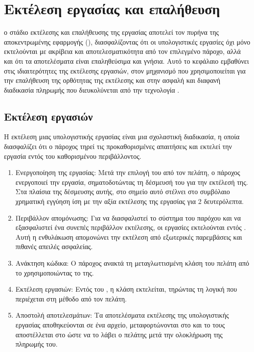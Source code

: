 \chapter{Εκτέλεση εργασίας και επαλήθευση}
 ο στάδιο εκτέλεσης και επαλήθευσης της εργασίας αποτελεί τον πυρήνα της αποκεντρωμένης εφαρμογής (), διασφαλίζοντας ότι οι υπολογιστικές εργασίες όχι μόνο εκτελούνται με ακρίβεια και αποτελεσματικότητα από τον επιλεγμένο πάροχο, αλλά και ότι τα αποτελέσματα είναι επαληθεύσιμα και γνήσια. Αυτό το κεφάλαιο εμβαθύνει στις ιδιαιτερότητες της εκτέλεσης εργασιών, στον μηχανισμό που χρησιμοποιείται για την επαλήθευση της ορθότητας της εκτέλεσης και στην ασφαλή και διαφανή διαδικασία πληρωμής που διευκολύνεται από την τεχνολογία .


\section{Εκτέλεση εργασιών}
Η εκτέλεση μιας υπολογιστικής εργασίας είναι μια σχολαστική διαδικασία, η οποία διασφαλίζει ότι ο πάροχος τηρεί τις προκαθορισμένες απαιτήσεις και εκτελεί την εργασία εντός του καθορισμένου περιβάλλοντος.
\begin{enumerate}
    \item Ενεργοποίηση της εργασίας: Μετά την επιλογή του από τον πελάτη, ο πάροχος ενεργοποιεί την εργασία, σηματοδοτώντας τη δέσμευσή του για την εκτέλεσή της. Στα πλαίσια της δέσμευσης αυτής, στο σημείο αυτό στέλνει στο συμβόλαιο χρηματική εγγύηση ίση με την αξία εκτέλεσης της εργασίας για 2 δευτερόλεπτα.
    \item Περιβάλλον απομόνωσης: Για να διασφαλιστεί το σύστημα του παρόχου και να εξασφαλιστεί ένα συνεπές περιβάλλον εκτέλεσης, οι εργασίες εκτελούνται εντός . Αυτή η ενθυλάκωση απομονώνει την εκτέλεση από εξωτερικές παρεμβάσεις και πιθανές απειλές ασφαλείας.
    \item Ανάκτηση κώδικα: Ο πάροχος ανακτά τη μεταγλωττισμένη κλάση  του πελάτη από το  χρησιμοποιώντας το  της.
    \item Εκτέλεση εργασιών: Εντός του , η κλάση  εκτελείται, τηρώντας τη λογική που περιέχεται στη μέθοδο \textit{} από τον πελάτη.
    \item Αποστολή αποτελεσμάτων: Τα αποτελέσματα εκτέλεσης της υπολογιστικής εργασίας αποθηκεύονται σε ένα αρχείο, μεταφορτώνονται στο  και το  τους αποστέλλεται στο  ώστε να το λάβει ο πελάτης μετά την ολοκλήρωση της πληρωμής του.
\end{enumerate}

